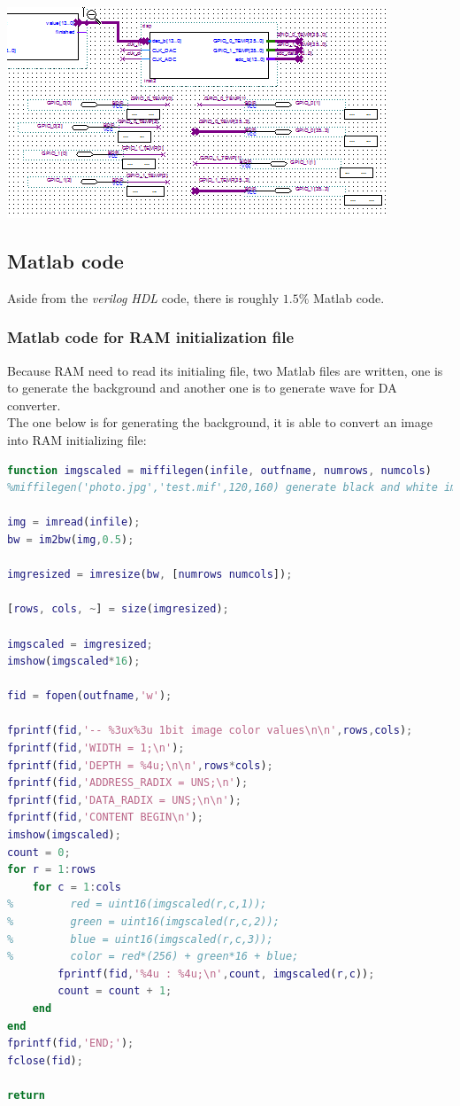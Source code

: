 \documentclass[11pt]{scrartcl}
\begin{document}
\begin{minipage}[t]{\linewidth}

{
\includegraphics[scale = 1]{adda.png}
}
\end{minipage}
\medskip

\subsection{Matlab code}

Aside from the \textit{verilog HDL} code, there is roughly $1.5\%$ Matlab code.   
\subsubsection{Matlab code for RAM initialization file} 
\label{sec:correct}
Because RAM need to read its initialing file, two Matlab files are written, one is to generate the background and another one is to generate wave for DA converter.\\

The one below is for generating the background, it is able to convert an image into RAM initializing file:
\begin{lstlisting}[language=Matlab]
function imgscaled = miffilegen(infile, outfname, numrows, numcols)
%miffilegen('photo.jpg','test.mif',120,160) generate black and white image.

img = imread(infile);
bw = im2bw(img,0.5);

imgresized = imresize(bw, [numrows numcols]);

[rows, cols, ~] = size(imgresized);

imgscaled = imgresized;
imshow(imgscaled*16);

fid = fopen(outfname,'w');

fprintf(fid,'-- %3ux%3u 1bit image color values\n\n',rows,cols);
fprintf(fid,'WIDTH = 1;\n');
fprintf(fid,'DEPTH = %4u;\n\n',rows*cols);
fprintf(fid,'ADDRESS_RADIX = UNS;\n');
fprintf(fid,'DATA_RADIX = UNS;\n\n');
fprintf(fid,'CONTENT BEGIN\n');
imshow(imgscaled);
count = 0;
for r = 1:rows
    for c = 1:cols
%         red = uint16(imgscaled(r,c,1));
%         green = uint16(imgscaled(r,c,2));
%         blue = uint16(imgscaled(r,c,3));
%         color = red*(256) + green*16 + blue;
        fprintf(fid,'%4u : %4u;\n',count, imgscaled(r,c));
        count = count + 1;
    end
end
fprintf(fid,'END;');
fclose(fid);

return
\end{lstlisting}
\end{document}
